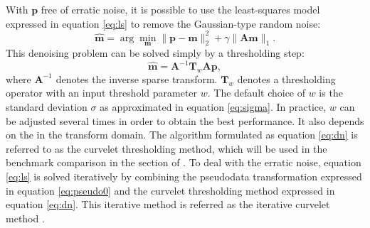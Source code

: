 
With $\mathbf{p}$ free of erratic noise, it is possible to use the least-squares model expressed in equation \ref{eq:ls} to remove the Gaussian-type random noise:
\begin{equation}
\label{eq:ls22}
\hat{\mathbf{m}} = \arg \min_{\mathbf{m}} \parallel \mathbf{p} - \mathbf{m} \parallel_2^2 + \gamma \parallel \mathbf{A}\mathbf{m} \parallel_1.
\end{equation}
This denoising problem can be solved simply by a thresholding step:
\begin{equation}
\label{eq:dn}
\hat{\mathbf{m}} = \mathbf{A}^{-1} \mathbf{T}_w \mathbf{A} \mathbf{p},
\end{equation}
where $\mathbf{A}^{-1}$ denotes the inverse sparse transform. $\mathbf{T}_w$ denotes a thresholding operator with an input threshold parameter $w$. The default choice of $w$ is the standard deviation $\sigma$ as approximated in equation \ref{eq:sigma}. In practice, $w$ can be adjusted several times in order to obtain the best performance. It also depends on the  in the transform domain. The algorithm formulated as equation \ref{eq:dn} is referred to as the curvelet thresholding method, which will be used in the benchmark comparison in the section of . To deal with the erratic noise, equation \ref{eq:ls} is solved iteratively by combining the pseudodata transformation expressed in equation \ref{eq:pseudo0} and the curvelet thresholding method expressed in equation \ref{eq:dn}. This iterative method is referred as the iterative curvelet method \cite[]{zhaoqiang2018}.

